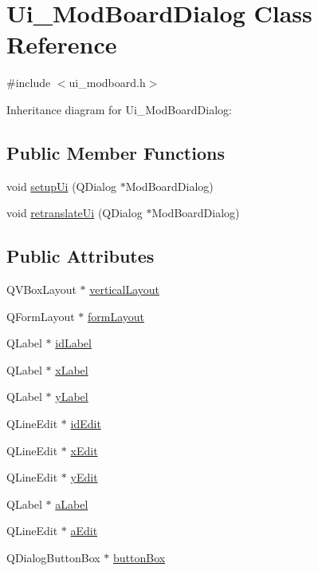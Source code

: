 \hypertarget{class_ui___mod_board_dialog}{}\section{Ui\+\_\+\+Mod\+Board\+Dialog Class Reference}
\label{class_ui___mod_board_dialog}


{\ttfamily \#include $<$ui\+\_\+modboard.\+h$>$}



Inheritance diagram for Ui\+\_\+\+Mod\+Board\+Dialog\+:
\subsection*{Public Member Functions}
\begin{DoxyCompactItemize}
\item 
void \hyperlink{class_ui___mod_board_dialog_a9125211e1551aba09b5790ba7a6c3e1f}{setup\+Ui} (Q\+Dialog $\ast$Mod\+Board\+Dialog)
\item 
void \hyperlink{class_ui___mod_board_dialog_a789445100e83414ab2635453a190a805}{retranslate\+Ui} (Q\+Dialog $\ast$Mod\+Board\+Dialog)
\end{DoxyCompactItemize}
\subsection*{Public Attributes}
\begin{DoxyCompactItemize}
\item 
Q\+V\+Box\+Layout $\ast$ \hyperlink{class_ui___mod_board_dialog_adebeb4496ff708074a988e8524bda435}{vertical\+Layout}
\item 
Q\+Form\+Layout $\ast$ \hyperlink{class_ui___mod_board_dialog_af60a8fed5f9bcc96dc5d89c014f8fc18}{form\+Layout}
\item 
Q\+Label $\ast$ \hyperlink{class_ui___mod_board_dialog_a3d6c7598ed51ef7a40e02291c5a1d6e7}{id\+Label}
\item 
Q\+Label $\ast$ \hyperlink{class_ui___mod_board_dialog_ad3a9d7ec1b175e5eda7b8f8c43242b11}{x\+Label}
\item 
Q\+Label $\ast$ \hyperlink{class_ui___mod_board_dialog_ab79e64edca1b5e18c0f8134559dfe2ad}{y\+Label}
\item 
Q\+Line\+Edit $\ast$ \hyperlink{class_ui___mod_board_dialog_a9244d9abc92bccb34853698722e4dd91}{id\+Edit}
\item 
Q\+Line\+Edit $\ast$ \hyperlink{class_ui___mod_board_dialog_a8058618d36747163b5dc0929d0b2c685}{x\+Edit}
\item 
Q\+Line\+Edit $\ast$ \hyperlink{class_ui___mod_board_dialog_a19a782a76ad8b8d00a188d88c7641cfc}{y\+Edit}
\item 
Q\+Label $\ast$ \hyperlink{class_ui___mod_board_dialog_a13f268c85f0b9ce5e900d50ec89f3fa1}{a\+Label}
\item 
Q\+Line\+Edit $\ast$ \hyperlink{class_ui___mod_board_dialog_abbd3d10d2952bf67d8acc5af0810bfc1}{a\+Edit}
\item 
Q\+Dialog\+Button\+Box $\ast$ \hyperlink{class_ui___mod_board_dialog_a043470d94c67a61e7905b9352c9bf8cd}{button\+Box}
\end{DoxyCompactItemize}


